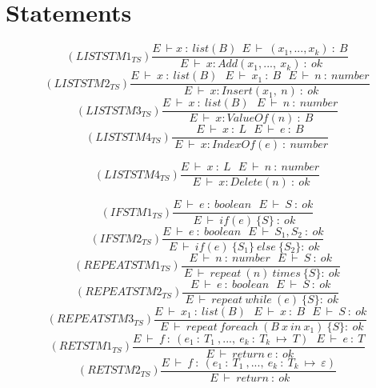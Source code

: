 \section{Statements}
\begin{equation}
(LISTSTM1_{TS}) \frac{E\ \vdash x\ :\ list(B) \ \ E\ \vdash\ (x_1,...,x_k)\ :\ B }
{\ E\ \vdash \ x:Add(x_1, ...,\ x_k)\ :\ ok}
\end{equation}
\begin{equation}
    (LISTSTM2_{TS}) \frac{E\ \vdash\ x\ :\ list(B) \ \ \ E\ \vdash\ x_1\ :\ B \ \ \ E\ \vdash\ n\ :\ number }
{\ E\ \vdash \ x:Insert(x_1,\ n)\ :\ ok}
\end{equation}
\begin{equation}
    (LISTSTM3_{TS}) \frac{E\ \vdash\ x\ :\ list(B) \ \  \ E\ \vdash\ n\ :\ number }
{\ E\ \vdash \ x:ValueOf(n)\ :\ B}
\end{equation}
\begin{equation}
(LISTSTM4_{TS}) \frac{E\ \vdash\ x\ :\ L  \ \  \ E\ \vdash\ e\ :\ B }
    {\ E\ \vdash \ x:IndexOf(e)\ :\ number}
\end{equation}

\begin{equation}
    (LISTSTM4_{TS}) \frac{E\ \vdash\ x\ :\ L \ \ \ E\ \vdash\ n\ :\ number }
{\ E\ \vdash \ x:Delete(n)\ :\ ok}
\end{equation}

\begin{equation}
    (IFSTM1_{TS}) \frac{E\ \vdash\ e\ :\ boolean \ \  \ E\ \vdash\ S\ :\ ok }
{\ E\ \vdash \ if(e)\ \lbrace S \rbrace\ :\ ok}
\end{equation}
\begin{equation}
    (IFSTM2_{TS}) \frac{E\ \vdash\ e\ :\ boolean \ \  \ E\ \vdash\ S_1, S_2\ :\ ok }
{\ E\ \vdash \ if(e)\ \lbrace S_1 \rbrace\ else \ \lbrace S_2 \rbrace:\ ok}
\end{equation}
\begin{equation}
    (REPEATSTM1_{TS}) \frac{E\ \vdash\ n\ :\ number \ \  \ E\ \vdash\ S\ :\ ok }
{\ E\ \vdash \ repeat\ (n)\ times \ \lbrace S \rbrace:\ ok}
\end{equation}
\begin{equation}
    (REPEATSTM2_{TS}) \frac{E\ \vdash\ e\ :\ boolean \ \  \ E\ \vdash\ S\ :\ ok }
{\ E\ \vdash \ repeat\ while\ (e) \ \lbrace S \rbrace:\ ok}
\end{equation}
\begin{equation}
    (REPEATSTM3_{TS}) \frac{E\ \vdash\ x_1\ :\ list(B) \ \ \ E\ \vdash\ x\ :\ B\ \ \  E\ \vdash\ S\ :\ ok }
{\ E\ \vdash \ repeat\ foreach\ (B\ x\ in\ x_1 ) \ \lbrace S \rbrace:\ ok}
\end{equation}
\begin{equation}
    (RETSTM1_{TS}) \frac{E\ \vdash\ f\ :\ (e_1 \ : \ T_1 \ , ... , \ e_k \ : \ T_k \ \mapsto \ T) \ \ \  E\ \vdash\ e\ :\ T }
{\ E\ \vdash \ return\ e\ :\ ok}
\end{equation}
\begin{equation}
    (RETSTM2_{TS}) \frac{E\ \vdash\ f\ :\ (e_1 \ : \ T_1 \ , ... , \ e_k \ : \ T_k \ \mapsto \ \varepsilon)}
{\ E\ \vdash \ return\ :\ ok}
\end{equation}


